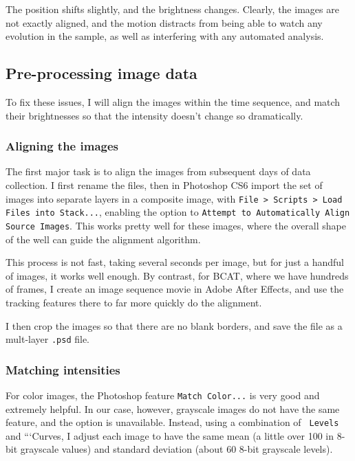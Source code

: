 The position shifts slightly, and the brightness changes. Clearly, the images
are not exactly aligned, and the motion distracts from being able to watch any
evolution in the sample, as well as interfering with any automated analysis.

\subsection{Pre-processing image
data}\hypertarget{pre-processing-image-data}{}\label{pre-processing-image-data} To fix these issues, I will align the images within the time sequence, and match
their brightnesses so that the intensity doesn't change so dramatically.

\subsubsection{Aligning the
images}\hypertarget{aligning-the-images}{}\label{aligning-the-images} The first major task is to align the images from subsequent days of data
collection. I first rename
the files, then in Photoshop CS6 import the set of images into separate layers
in a composite image, with {\tt File \textgreater{} Scripts \textgreater{} Load
Files into Stack...}, enabling the option to {\tt Attempt to Automatically Align
Source Images}. This works pretty well for these images, where the overall shape
of the well can guide the alignment algorithm.

This process is not fast, taking several seconds per image, but for just a
handful of images, it works well enough. By contrast, for BCAT, where we have
hundreds of frames, I create an image sequence movie in Adobe After Effects, and
use the tracking features there to far more quickly do the alignment.

I then crop the images so that there are no blank borders, and save the file as
a mult-layer {\tt .psd} file.

\subsubsection{Matching
intensities}\hypertarget{matching-intensities}{}\label{matching-intensities} For color images, the Photoshop feature {\tt Match Color...} is very good and
extremely helpful. In our case, however, grayscale images do not have the same
feature, and the option is unavailable. Instead, using a combination of {\tt
Levels} and ```Curves, I adjust each image to have the same mean (a little over
100 in 8-bit grayscale values) and standard deviation (about 60 8-bit grayscale
levels).

